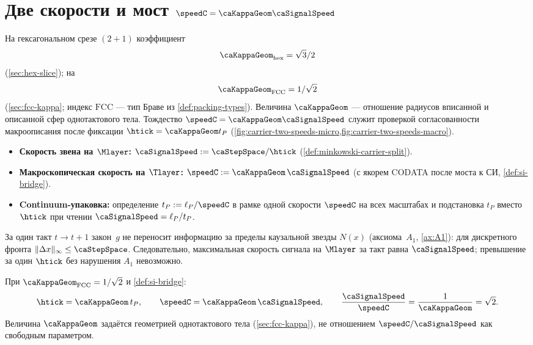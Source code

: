 \section{Две скорости и мост $\speedC=\caKappaGeom \caSignalSpeed$}
\label{sec:two-c}

На гексагональном срезе $(2{+}1)$ коэффициент
\[
\caKappaGeom_{\mathrm{hex}}=\sqrt{3}/2
\]
(\cref{sec:hex-slice}); на \latGCK
\[
\caKappaGeom_{\mathrm{FCC}}=1/\sqrt{2}
\]
(\cref{sec:fcc-kappa}; индекс $\mathrm{FCC}$ --- тип Браве из \cref{def:packing-types}).
Величина $\caKappaGeom$ --- отношение радиусов вписанной и описанной сфер однотактового тела.
Тождество $\speedC=\caKappaGeom \caSignalSpeed$ служит проверкой согласованности макроописания
после фиксации $\htick=\caKappaGeom t_P$ (\cref{fig:carrier-two-speeds-micro,fig:carrier-two-speeds-macro}).

\begin{definition}
\label{def:two-speeds-formal}
\begin{itemize}
  \item \textbf{Скорость звена на $\Mlayer$:}
  $\caSignalSpeed:=\caStepSpace/\htick$ (\cref{def:minkowski-carrier-split}).
  \item \textbf{Макроскопическая скорость на $\Tlayer$:}
  $\speedC:=\caKappaGeom\,\caSignalSpeed$ (с якорем CODATA после моста к СИ, \cref{def:si-bridge}).
  \item \textbf{Continuum-упаковка:}
  определение $t_P:=\ell_P/\speedC$ в рамке одной скорости $\speedC$ на всех масштабах
  и подстановка $t_P$ вместо $\htick$ при чтении $\caSignalSpeed=\ell_P/t_P$.
\end{itemize}
\end{definition}

\begin{proposition}
\label{prop:m-one-tick-cone}
За один такт $t\to t+1$ закон~$g$ не переносит информацию за пределы каузальной звезды $N(x)$
(аксиома~$A_1$, \cref{ax:A1}): для дискретного фронта
$\|\Delta x\|_\infty\le \caStepSpace$.
Следовательно, максимальная скорость сигнала на $\Mlayer$ за такт равна $\caSignalSpeed$;
превышение за один $\htick$ без нарушения $A_1$ невозможно.
\end{proposition}

\begin{proposition}
\label{prop:c0-over-c}
При $\caKappaGeom_{\mathrm{FCC}}=1/\sqrt{2}$ и \cref{def:si-bridge}:
\[
  \htick=\caKappaGeom\, t_P,\qquad
  \speedC=\caKappaGeom\,\caSignalSpeed,\qquad
  \frac{\caSignalSpeed}{\speedC}=\frac{1}{\caKappaGeom}=\sqrt{2}.
\]
Величина $\caKappaGeom$ задаётся геометрией однотактового тела (\cref{sec:fcc-kappa}),
не отношением $\speedC/\caSignalSpeed$ как свободным параметром.
\end{proposition}

